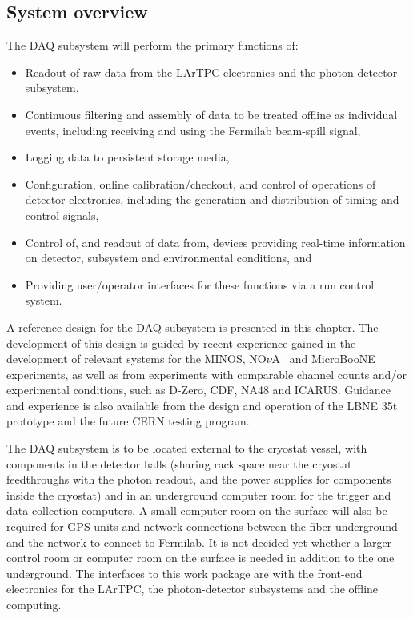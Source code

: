 \subsection{System overview} 

The DAQ subsystem will perform the primary functions of:

\begin{itemize}
  \item Readout of raw data from the LArTPC electronics and the photon
    detector subsystem,

  \item Continuous filtering and assembly of data to be treated
    offline as individual events, including receiving and using the
    Fermilab beam-spill signal, 

  \item Logging data to persistent storage media,

  \item Configuration, online calibration/checkout, and control of 
        operations of detector electronics, including the generation 
        and distribution of timing and control signals,

  \item Control of, and readout of data from, devices 
        providing real-time information on detector, subsystem 
        and environmental conditions, and  

  \item Providing user/operator interfaces for these functions via 
        a run control system.
\end{itemize}

A reference design for the DAQ subsystem is presented in this chapter.
The development of this design is guided by recent experience gained
in the development of relevant systems for the MINOS,
NO$\nu$A~\cite{novatdr} and MicroBooNE~\cite{microboonecdr}
experiments, as well as from experiments with comparable channel
counts and/or experimental conditions, such as D-Zero, CDF, NA48 and
ICARUS.  Guidance and experience is also available from the design and
operation of the LBNE 35t prototype and the future CERN testing
program.

The DAQ subsystem is to be located external to the cryostat vessel,
with components in the detector halls (sharing rack space near the
cryostat feedthroughs with the photon readout, and the power supplies
for components inside the cryostat) and in an underground computer
room for the trigger and data collection computers.  A small computer
room on the surface will also be required for GPS units and network 
connections between the fiber underground and the network to connect 
to Fermilab.  It is not decided yet whether a larger control room or 
computer room on the surface is needed in addition to the one underground. 
The interfaces to this work package are with the front-end electronics for the LArTPC, the
photon-detector subsystems and the offline computing.  

